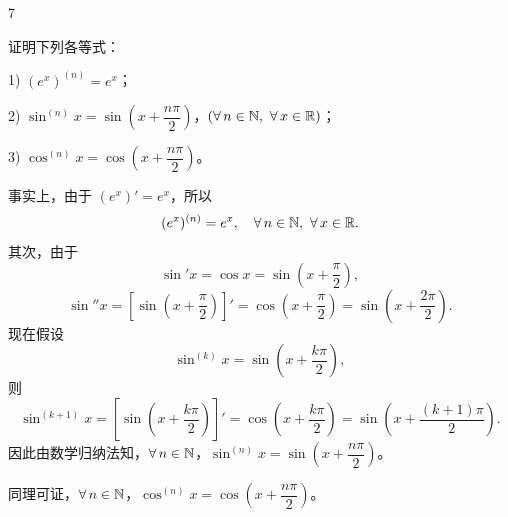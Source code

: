 \begin{sourceexample}{7}

	证明下列各等式：

	1) \((e^x)^{(n)}=e^x\)；

	2) \(\sin^{(n)}x=\sin\left(x+\dfrac{n\pi}{2}\right)\)，\((\forall\,n\in\mathbb{N},\ \forall\,x\in\mathbb{R})\)；

	3) \(\cos^{(n)}x=\cos\left(x+\dfrac{n\pi}{2}\right)\)。

	事实上，由于 \((e^x)'=e^x\)，所以
	\[
	(e^x)^{(n)}=e^x,\quad\forall\,n\in\N,\ \forall\,x\in\R.
	\]
	其次，由于
	\[
	\sin'x=\cos x=\sin\left(x+\frac\pi2\right),
	\]
	\[
	\sin''x=\left[\sin\left(x+\frac\pi2\right)\right]'=\cos\left(x+\frac\pi2\right)=\sin\left(x+\frac{2\pi}{2}\right).
	\]
	现在假设
	\[
	\sin^{(k)}x=\sin\left(x+\frac{k\pi}{2}\right),
	\]
	则
	\[
	\sin^{(k+1)}x=\left[\sin\left(x+\frac{k\pi}{2}\right)\right]'=\cos\left(x+\frac{k\pi}{2}\right)=\sin\left(x+\frac{(k+1)\pi}{2}\right).
	\]
	因此由数学归纳法知，\(\forall\,n\in\mathbb{N}\)，\(\sin^{(n)}x=\sin\left(x+\dfrac{n\pi}{2}\right)\)。

	同理可证，\(\forall\,n\in\mathbb{N}\)，\(\cos^{(n)}x=\cos\left(x+\dfrac{n\pi}{2}\right)\)。

\end{sourceexample}

